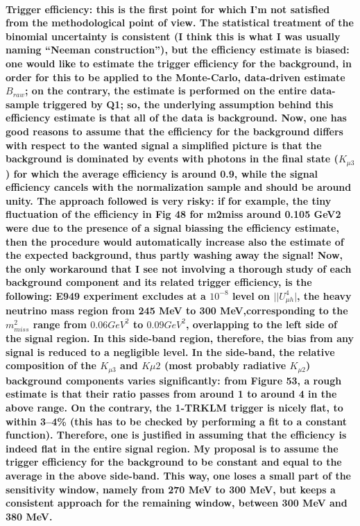 \documentclass[12pt]{report}
\begin{document}
\paragraph{Trigger efficiency: this is the first point for which I'm not satisfied from the methodological point of view. 
    The statistical treatment of the binomial uncertainty is consistent 
    (I think this is what I was usually naming ``Neeman construction''), 
    but the efficiency estimate is biased: one would like to estimate the trigger efficiency for the background, 
    in order for this to be applied to the Monte-Carlo, data-driven estimate $B_{raw}$;
    on the contrary, the estimate is performed on the entire data-sample triggered by Q1; 
    so, the underlying assumption behind this efficiency estimate is that all of the data is background.
    Now, one has good reasons to assume that the efficiency for the background differs with respect to the wanted signal
    a simplified picture is that the background is dominated by events with photons in the final state ($K_{\mu3}$) 
    for which the average efficiency is around 0.9, 
    while the signal efficiency cancels with the normalization sample and should be around unity.
    The approach followed is very risky:
    if for example, the tiny fluctuation of the efficiency in Fig 48 for m2miss around 0.105 GeV2
    were due to the presence of a signal biassing the efficiency estimate, then the procedure would automatically increase also the estimate of the expected background, thus partly washing away the signal!
    Now, the only workaround that I see not involving a thorough study of each background component
    and its related trigger efficiency, is the following: 
    E949 experiment excludes at a $10^{−8}$ level on $||U^4_{\mu h}|$,
    the heavy neutrino mass region from 245 MeV to 300 MeV,corresponding to the ${m^2_{miss}}$ range
    from $0.06 GeV^2$ to $0.09 GeV^2$, overlapping to the left side of the signal region. 
    In this side-band region, therefore, the bias from any signal is reduced to a negligible level.
    In the side-band, the relative composition of the $K_{\mu3}$ and $K{\mu2}$ 
    (most probably radiative $K_{\mu2}$) background components varies significantly:
    from Figure 53, a rough estimate is that their ratio passes from around 1 to around 4 in the above range.
    On the contrary, the 1-TRKLM trigger is nicely flat, to within 3–4\%
    (this has to be checked by performing a fit to a constant function).
    Therefore, one is justified in assuming that the efficiency is indeed flat in the entire signal region.
    My proposal is to assume the trigger efficiency for the background to be constant and equal to the average in the above side-band.
    This way, one loses a small part of the sensitivity window, namely from 270 MeV to 300 MeV, 
but keeps a consistent approach for the remaining window, between 300 MeV and 380 MeV.}
\end{document}
